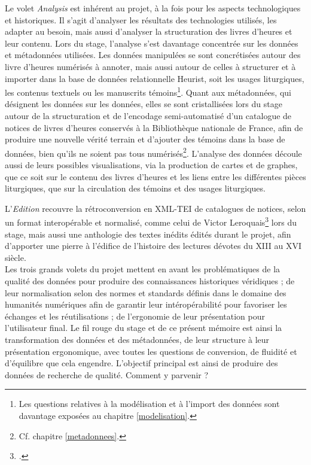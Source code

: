 \documentclass[a4paper,12pt,twoside]{book}
\begin{document}
Le volet \textit{Analysis} est inhérent au projet, à la fois pour les aspects technologiques et historiques. Il s'agit d'analyser les résultats des technologies utilisés, les adapter au besoin, mais aussi d'analyser la structuration des livres d'heures et leur contenu. Lors du stage, l'analyse s'est davantage concentrée sur les données et métadonnées utilisées. Les données manipulées se sont concrétisées autour des livre d'heures numérisés à annoter, mais aussi autour de celles à structurer et à importer dans la base de données relationnelle Heurist, soit les usages liturgiques, les contenus textuels ou les manuscrits témoins\footnote{Les questions relatives à la modélisation et à l'import des données sont davantage exposées au chapitre \ref{modelisation}.}. Quant aux métadonnées, qui désignent les données sur les données, elles se sont cristallisées lors du stage autour de la structuration et de l'encodage semi-automatisé d'un catalogue de notices de livres d'heures conservés à la Bibliothèque nationale de France, afin de produire une nouvelle vérité terrain et d'ajouter des témoins dans la base de données, bien qu'ils ne soient pas tous numérisés\footnote{Cf. chapitre \ref{metadonnees}.}. L'analyse des données découle aussi de leurs possibles visualisations, via la production de cartes et de graphes, que ce soit sur le contenu des livres d'heures et les liens entre les différentes pièces liturgiques, que sur la circulation des témoins et des usages liturgiques. 

L'\textit{Edition} recouvre la rétroconversion en XML-TEI de catalogues de notices, selon un format interopérable et normalisé, comme celui de Victor Leroquais\footcite{Leroquais_notices} lors du stage, mais aussi une anthologie des textes inédits édités durant le projet, afin d'apporter une pierre à l'édifice de l'histoire des lectures dévotes du \textsc{XIII} au \textsc{XVI} siècle. \\

Les trois grands volets du projet mettent en avant les problématiques de la qualité des données pour produire des connaissances historiques véridiques ; de leur normalisation selon des normes et standards définis dans le domaine des humanités numériques afin de garantir leur intéropérabilité pour favoriser les échanges et les réutilisations ; de l'ergonomie de leur présentation pour l'utilisateur final. Le fil rouge du stage et de ce présent mémoire est ainsi la transformation des données et des métadonnées, de leur structure à leur présentation ergonomique, avec toutes les questions de conversion, de fluidité et d’équilibre que cela engendre. L’objectif principal est ainsi de produire des données de recherche de qualité. Comment y parvenir ? \\
\end{document}
